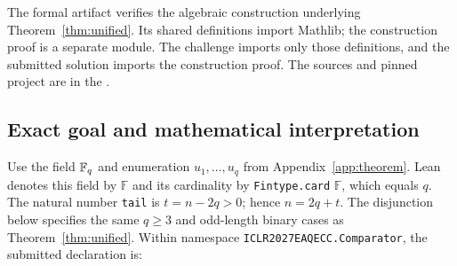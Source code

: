 The formal artifact verifies the algebraic construction underlying
Theorem~\ref{thm:unified}. Its shared definitions import Mathlib; the
construction proof is a separate module. The challenge imports only
those definitions, and the submitted solution imports the construction
proof. The sources and pinned project are in the \artifactlink{}.


\subsection{Exact goal and mathematical interpretation}\label{app:lean-theorem}
Use the field $\mathbb{F}_q$ and enumeration $u_1,\ldots,u_q$ from
Appendix~\ref{app:theorem}. Lean denotes this field by $\mathbb F$ and
its cardinality by \texttt{Fintype.card} $\mathbb F$, which equals $q$.
The natural number \texttt{tail} is $t=n-2q>0$; hence $n=2q+t$.
The disjunction below specifies the same $q\ge3$ and odd-length binary
cases as Theorem~\ref{thm:unified}. Within namespace \texttt{ICLR2027EAQECC.Comparator}, the
submitted declaration is:




